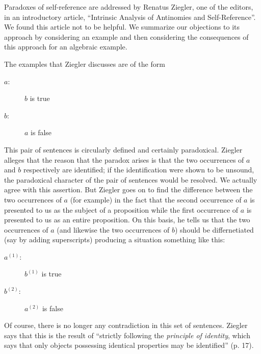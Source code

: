 Paradoxes of self-reference are addressed by Renatus Ziegler, one of
the editors, in an introductory article, ``Intrinsic Analysis of
Antinomies and Self-Reference''.  We found this article not to be
helpful.  We summarize our objections to its approach by considering
an example and then considering the consequences of this approach for
an algebraic example.

The examples that Ziegler discusses are of the form

\begin{description}

\item[$a$:]  $b$ is true

\item[$b$:]  $a$ is false

\end{description}

This pair of sentences is circularly defined and certainly
paradoxical.  Ziegler alleges that the reason that the paradox arises
is that the two occurrences of $a$ and $b$ respectively are
identified; if the identification were shown to be unsound, the
paradoxical character of the pair of sentences would be resolved.  We
actually agree with this assertion.  But Ziegler goes on to find the
difference between the two occurrences of $a$ (for example) in the
fact that the second occurrence of $a$ is presented to us as the
subject of a proposition while the first occurrence of $a$ is
presented to us as an entire proposition.  On this basis, he tells us
that the two occurrences of $a$ (and likewise the two occurrences of
$b$) should be differnetiated (say by adding superscripts) producing a
situation something like this:


\begin{description}

\item[$a^{(1)}$:]  $b^{(1)}$ is true

\item[$b^{(2)}$:]  $a^{(2)}$ is false

\end{description}

Of course, there is no longer any contradiction in this set of
sentences.  Ziegler says that this is the result of ``strictly
following the {\em principle of identity\/}, which says that only
objects possessing identical properties may be identified'' (p. 17).

